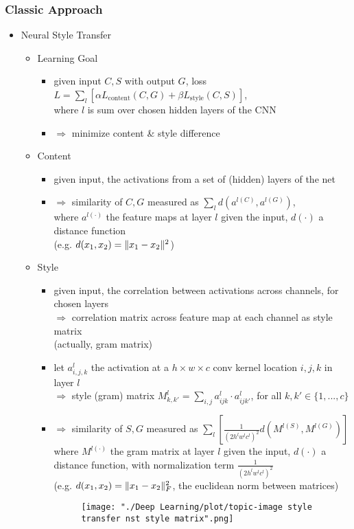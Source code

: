 \subsubsection{Classic Approach}
\begin{itemize}
\item Neural Style Transfer
	\begin{itemize}
	\item Learning Goal
		\begin{itemize}
		\item given input $C,S$ with output $G$, loss $L = \sum_{l} \left[\alpha L_\text{content}(C,G) + \beta L_\text{style}(C,S)\right]$, \\
		where $l$ is sum over chosen hidden layers of the CNN
		\item $\Rightarrow$ minimize content \& style difference
		\end{itemize}
	\item Content
		\begin{itemize}
		\item given input, the activations from a set of (hidden) layers of the net
		\item $\Rightarrow$ similarity of $C, G$ measured as $\sum_l d(a^{l(C)}, a^{l(G)})$, \\ 
		where $a^{l(\cdot)}$ the feature maps at layer $l$ given the input, $d(\cdot)$ a distance function \\
		(e.g. $d(x_1,x_2) = \lVert x_1 - x_2\rVert^2$)
		\end{itemize}
	\item Style
		\begin{itemize}
		\item given input, the correlation between activations across channels, for chosen layers \\
		$\Rightarrow$ correlation matrix across feature map at each channel as style matrix \\
		(actually, gram matrix)
		\item let $a_{i,j,k}^l$ the activation at a $h\times w\times c$ conv kernel location $i,j,k$ in layer $l$ \\ 
		$\Rightarrow$ style (gram) matrix $M^l_{k,k'} = \sum_{i,j}a^l_{ijk}\cdot a^l_{ijk'}$, for all $k,k'\in\{1,...,c\}$
		\item $\Rightarrow$ similarity of $S, G$ measured as $\sum_l \left[ \frac 1 {(2 h^l w^l c^l)^2} d(M^{l(S)}, M^{l(G)}) \right] $ \\
		where $M^{l(\cdot)}$ the gram matrix at layer $l$ given the input, $d(\cdot)$ a distance function, with normalization term $\frac 1 {(2 h^l w^l c^l)^2}$ \\
		(e.g. $d(x_1, x_2) = \lVert x_1-x_2\rVert^2_F$, the euclidean norm between matrices)
		\begin{figure}[ht]
		\texttt{[image: "./Deep Learning/plot/topic-image style transfer nst style matrix".png]}
		\end{figure}	
		\end{itemize}
	\end{itemize}
\end{itemize}

